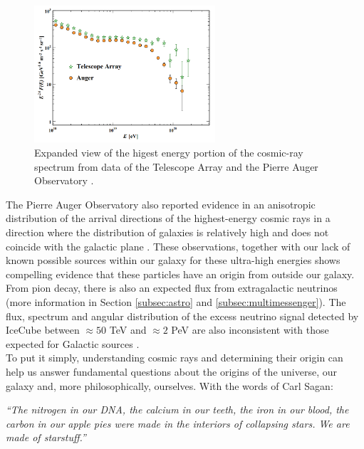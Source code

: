 \begin{figure}
\centering
\includegraphics[width=0.6\textwidth]{chapter3/img/ankle.png}
\caption{Expanded view of the higest energy portion of the cosmic-ray spectrum from data of the Telescope Array and the Pierre Auger Observatory \cite{PDG2018url}.}
\label{fig:ankle}
\end{figure}
The Pierre Auger Observatory also reported evidence in an anisotropic distribution of the arrival directions of the highest-energy cosmic rays in a direction where the distribution of galaxies is relatively high and does not coincide with the galactic plane \cite{Aab:2017tyv}. These observations, together with our lack of known possible sources within our galaxy for these ultra-high energies shows compelling evidence that these particles have an origin from outside our galaxy. From pion decay, there is also an expected flux from extragalactic neutrinos (more information in Section \ref{subsec:astro} and \ref{subsec:multimessenger}). The flux, spectrum and angular distribution of the excess neutrino signal detected by IceCube between $\approx 50$ TeV and $\approx 2$ PeV are also inconsistent with those expected for Galactic sources \cite{Waxman:2013zda}.\\
\newline
To put it simply, understanding cosmic rays and determining their origin can help us answer fundamental questions about the origins of the universe, our galaxy and, more philosophically, ourselves. With the words of Carl Sagan:

\begin{center}
\begin{minipage}[5cm]{0.9\textwidth}
\textit{``The nitrogen in our DNA, the calcium in our teeth, the iron in our blood, the carbon in our apple pies were made in the interiors of collapsing stars. We are made of starstuff.''}
\end{minipage}
\end{center}

